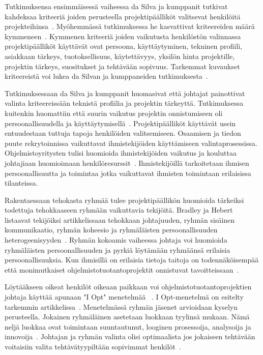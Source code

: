 \documentclass[finnish]{tktltiki2}
\theoremstyle{definition}
\theoremstyle{remark}
\begin{document}
Tutkimuksensa ensimmäisessä vaiheessa da Silva ja kumppanit tutkivat kahdeksaa kriteeriä joiden perusteella projektipäälliköt valitsevat henkilöitä projekteihinsa~\cite{francca2009quantitative}. Myöhemmässä tutkimuksessa he kasvattivat kriteereiden määrä kymmeneen~\cite{daSilva2012}. Kymmenen kriteeriä joiden vaikutusta henkilöstön valinnassa projektipäälliköt käyttävät ovat persoona, käyttäytyminen, tekninen profiili, asiakkaan tärkeys, tuotoksellisuus, käytettävyys, yksilön hinta projektille, projektin tärkeys, suositukset ja tehtävään sopivuus. Tarkemmat kuvaukset kriteereistä voi lukea da Silvan ja kumppaneiden tutkimuksesta~\cite{daSilva2012}.

Tutkimuksessaan da Silva ja kumppanit huomasivat että johtajat painottivat valinta kriteereissään teknistä profiilia ja projektin tärkeyttä. Tutkimuksessa kuitenkin huomattiin että suurin vaikutus projektin onnistumiseen oli persoonallisuudella ja käyttäytymisellä~\cite{daSilva2012}. Projektipäälliköt käyttävät usein entuudestaan tuttuja tapoja henkilöiden valitsemiseen. Osaamisen ja tiedon puute rekrytoinnissa vaikuttavat ihmistekijöiden käyttämiseen valintaprosessissa. Ohjelmistoyritysten tulisi huomioida ihmistekijöiden vaikutus ja kouluttaa johtajiaan huomioimaan henkilöresurssit~\cite{daSilva2012}. Ihmistekijöillä tarkoitetaan ihmisen persoonallisuutta ja toimintaa jotka vaikuttavat ihmisten toimintaan erilaisissa tilanteissa.

Rakentaessaan tehokasta ryhmää tulee projektipäällikön huomioida tärkeiksi todettuja tehokkaaseen ryhmään vaikuttavia tekijöitä. Bradley ja Hebert listaavat tekijöiksi artikkelissaan tehokkaan johtajuuden, ryhmän sisäinen kommunikaatio, ryhmän koheesio ja ryhmäläisten persoonallisuuden heterogeenisyyden~\cite{bradley1997effect}. Ryhmän kokoamis vaiheessa johtaja voi huomioida ryhmäläisten persoonallisuuden ja pyrkiä löytämään ryhmäänsä erilaisia persoonallisuuksia. Kun ihmisillä on erilaisia tietoja taitoja on todennäköisempää että monimutkaiset ohjelmistotuotantoprojektit onnistuvat tavoitteissaan~\cite{bradley1997effect}.

Löytääkseen oikeat henkilöt oikeaan paikkaan voi ohjelmistotuotantoprojektien johtaja käyttää apunaan "I Opt" menetelmää ~\cite{Dhomne:2012:ITL:2382887.2382899}. I Opt-menetelmä on esitelty tarkemmin artikkelissa~\cite{ kliem1996teambuilding}. Menetelmässä ryhmän jäsenet arvioidaan kyselyn perusteella. Jokainen ryhmäläinen asetetaan luokkaan tyylinsä mukaan. Nämä neljä luokkaa ovat toimintaan suuntautunut, looginen prosessoija, analysoija ja innovoija~\cite{ kliem1996teambuilding}. Johtajan ja ryhmän valinta olisi optimaalista jos jokaiseen tehtävään voitaisiin valita tehtävätyypiltään sopivimmat henkilöt~\cite{Dhomne:2012:ITL:2382887.2382899}.
\end{document}
